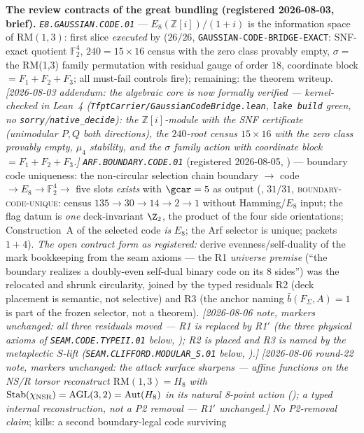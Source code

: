 \par\smallskip\noindent\textbf{The review contracts of the great
bundling (registered 2026-08-03, brief).}
\emph{\texttt{E8.GAUSSIAN.CODE.01}} --- $E_8(\mathbb{Z}[i])/(1+i)$ is
the information space of $\mathrm{RM}(1,3)$: first slice
\emph{executed} by  ($26/26$,
\texttt{GAUSSIAN-CODE-BRIDGE-EXACT}: SNF-exact quotient
$\mathbb{F}_2^4$, $240=15\times16$ census with the zero class
provably empty, $\sigma=$ the RM(1,3) family permutation with
residual gauge of order $18$, coordinate block $=F_1{+}F_2{+}F_3$;
all must-fail controls fire); remaining: the theorem writeup.
\emph{[2026-08-03 addendum: the algebraic core is now formally
verified --- kernel-checked in Lean~4
(\texttt{TfptCarrier/GaussianCodeBridge.lean}, \texttt{lake build}
green, no \texttt{sorry}/\texttt{native\_decide}): the
$\mathbb{Z}[i]$-module with the SNF certificate (unimodular $P,Q$
both directions), the $240$-root census $15\times16$ with the zero
class provably empty, $\mu_4$ stability, and the $\sigma$ family
action with coordinate block $=F_1{+}F_2{+}F_3$.]}
\emph{\texttt{ARF.BOUNDARY.CODE.01}} (registered 2026-08-05, \mO)
--- boundary code uniqueness: the non-circular selection chain
boundary $\to$ code $\to E_8\to\mathbb F_2^4\to$ five slots
\emph{exists} with $\gcar=5$ as output
(, $31/31$,
\textsc{boundary-code-unique}: census $135\to30\to14\to2\to1$
without Hamming/$E_8$ input; the flag datum is \emph{one}
deck-invariant $\Z_2$, the product of the four side orientations;
Construction~A of the selected code \emph{is} $E_8$; the Arf
selector is unique; packets $1+4$).  \emph{The open contract form
as registered:} derive evenness/self-duality of the mark
bookkeeping from the seam axioms --- the R1 \emph{universe premise}
(``the boundary realizes a doubly-even self-dual binary code on
its 8 sides'') was the relocated and shrunk circularity, joined by
the typed residuals R2 (deck placement is semantic, not selective)
and R3 (the anchor naming $\bar b(F_\Sigma,A)=1$ is part of the
frozen selector, not a theorem).  \emph{[2026-08-06 note, markers
unchanged: all three residuals moved --- R1 is replaced by R1$'$
(the three physical axioms of \texttt{SEAM.CODE.TYPEII.01} below,
); R2 is placed and R3 is named
by the metaplectic $S$-lift
(\texttt{SEAM.CLIFFORD.MODULAR\_S.01} below,
).]}  \emph{[2026-08-06
round-22 note, markers unchanged: the attack surface sharpens ---
affine functions on the NS/R torsor reconstruct
$\mathrm{RM}(1,3)=H_8$ with
$\mathrm{Stab}(\chi_{\rm NSR})=\mathrm{AGL}(3,2)=\mathrm{Aut}(H_8)$
in its natural 8-point action
(); a typed internal
reconstruction, not a P2 removal --- R1$'$ unchanged.]}  \emph{No
P2-removal claim}; kills: a second boundary-legal code surviving
